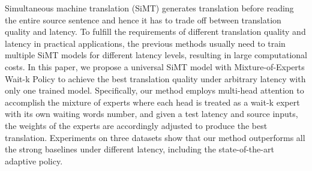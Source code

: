 Simultaneous machine translation (SiMT) generates translation before reading the entire source sentence and hence it has to trade off between translation quality and latency. To fulfill the requirements of different translation quality and latency in practical applications, the previous methods usually need to train multiple SiMT models for different latency levels, resulting in large computational costs. In this paper, we propose a universal SiMT model with Mixture-of-Experts Wait-k Policy to achieve the best translation quality under arbitrary latency with only one trained model. Specifically, our method employs multi-head attention to accomplish the mixture of experts where each head is treated as a wait-k expert with its own waiting words number, and given a test latency and source inputs, the weights of the experts are accordingly adjusted to produce the best translation. Experiments on three datasets show that our method outperforms all the strong baselines under different latency, including the state-of-the-art adaptive policy.
